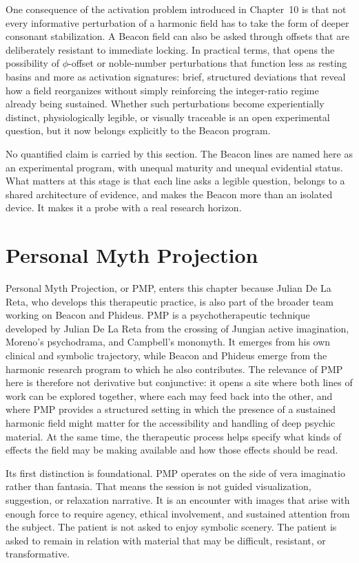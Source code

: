 One consequence of the activation problem introduced in Chapter~10 is that not every informative perturbation of a harmonic field has to take the form of deeper consonant stabilization. A Beacon field can also be asked through offsets that are deliberately resistant to immediate locking. In practical terms, that opens the possibility of $\phi$-offset or noble-number perturbations that function less as resting basins and more as activation signatures: brief, structured deviations that reveal how a field reorganizes without simply reinforcing the integer-ratio regime already being sustained. Whether such perturbations become experientially distinct, physiologically legible, or visually traceable is an open experimental question, but it now belongs explicitly to the Beacon program.

No quantified claim is carried by this section. The Beacon lines are named here as an experimental program, with unequal maturity and unequal evidential status. What matters at this stage is that each line asks a legible question, belongs to a shared architecture of evidence, and makes the Beacon more than an isolated device. It makes it a probe with a real research horizon.


\section{Personal Myth Projection}


Personal Myth Projection, or PMP, enters this chapter because Julian De La Reta, who develops this therapeutic practice, is also part of the broader team working on Beacon and Phideus. PMP is a psychotherapeutic technique developed by Julian De La Reta from the crossing of Jungian active imagination, Moreno's psychodrama, and Campbell's monomyth. It emerges from his own clinical and symbolic trajectory, while Beacon and Phideus emerge from the harmonic research program to which he also contributes. The relevance of PMP here is therefore not derivative but conjunctive: it opens a site where both lines of work can be explored together, where each may feed back into the other, and where PMP provides a structured setting in which the presence of a sustained harmonic field might matter for the accessibility and handling of deep psychic material. At the same time, the therapeutic process helps specify what kinds of effects the field may be making available and how those effects should be read.

Its first distinction is foundational. PMP operates on the side of vera imaginatio rather than fantasia. That means the session is not guided visualization, suggestion, or relaxation narrative. It is an encounter with images that arise with enough force to require agency, ethical involvement, and sustained attention from the subject. The patient is not asked to enjoy symbolic scenery. The patient is asked to remain in relation with material that may be difficult, resistant, or transformative.


